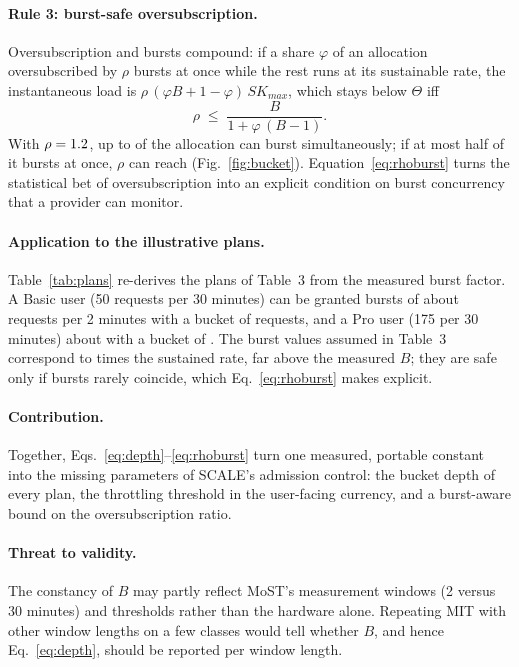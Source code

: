 \paragraph{Rule 3: burst-safe oversubscription.} Oversubscription and bursts compound: if a share
$\varphi$ of an allocation oversubscribed by $\rho$ bursts at once while the rest runs at its sustainable
rate, the instantaneous load is $\rho\,(\varphi B + 1 - \varphi)\,SK_{max}$, which stays below $\Theta$ iff
\begin{equation}
  \rho \;\le\; \frac{B}{1+\varphi\,(B-1)} .
  \label{eq:rhoburst}
\end{equation}
With $\rho=1.2$, up to \scaleTbPhiMax of the allocation can burst simultaneously; if at most half
of it bursts at once, $\rho$ can reach \scaleTbRhoMaxHalf (Fig.~\ref{fig:bucket}). Equation~\eqref{eq:rhoburst}
turns the statistical bet of oversubscription into an explicit condition on burst concurrency that a
provider can monitor.

\paragraph{Application to the illustrative plans.} Table~\ref{tab:plans} re-derives the plans of
Table~3 from the measured burst factor. A Basic user (50 requests per 30 minutes) can be granted bursts
of about \scaleTbBasicBurstTwo requests per 2 minutes with a bucket of \scaleTbBasicDepth requests, and a Pro
user (175 per 30 minutes) about \scaleTbProBurstTwo with a bucket of \scaleTbProDepth. The burst values
assumed in Table~3 correspond to \scaleTbPaperRatio times the sustained rate, far above the measured
$B$; they are safe only if bursts rarely coincide, which Eq.~\eqref{eq:rhoburst} makes explicit.

\paragraph{Contribution.} Together, Eqs.~\eqref{eq:depth}--\eqref{eq:rhoburst} turn one measured, portable
constant into the missing parameters of SCALE's admission control: the bucket depth of every plan, the
throttling threshold in the user-facing currency, and a burst-aware bound on the oversubscription ratio.

\paragraph{Threat to validity.} The constancy of $B$ may partly reflect MoST's measurement windows
(2 versus 30 minutes) and thresholds rather than the hardware alone. Repeating MIT with other window
lengths on a few classes would tell whether $B$, and hence Eq.~\eqref{eq:depth}, should be reported per
window length.

